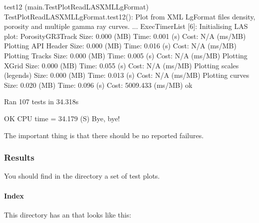 \documentclass[letterpaper,10pt,english]{sphinxmanual}
\begin{document}
\begin{sphinxVerbatim}[commandchars=\\\{\}]
test\PYGZus{}12 (\PYGZus{}\PYGZus{}main\PYGZus{}\PYGZus{}.TestPlotReadLAS\PYGZus{}XML\PYGZus{}LgFormat)
TestPlotReadLAS\PYGZus{}XML\PYGZus{}LgFormat.test\PYGZus{}12(): Plot from XML LgFormat files \PYGZhy{} density, porosity and multiple gamma ray curves. ...  ExecTimerList [6]:
 Initialising LAS plot: \PYGZdq{}Porosity\PYGZus{}GR\PYGZus{}3Track\PYGZdq{} Size:    0.000 (MB) Time:    0.001 (s) Cost:        N/A (ms/MB)
 Plotting API Header                         Size:    0.000 (MB) Time:    0.016 (s) Cost:        N/A (ms/MB)
 Plotting Tracks                             Size:    0.000 (MB) Time:    0.005 (s) Cost:        N/A (ms/MB)
 Plotting XGrid                              Size:    0.000 (MB) Time:    0.055 (s) Cost:        N/A (ms/MB)
 Plotting scales (legends)                   Size:    0.000 (MB) Time:    0.013 (s) Cost:        N/A (ms/MB)
 Plotting curves                             Size:    0.020 (MB) Time:    0.096 (s) Cost:   5009.433 (ms/MB)  ok

\PYGZhy{}\PYGZhy{}\PYGZhy{}\PYGZhy{}\PYGZhy{}\PYGZhy{}\PYGZhy{}\PYGZhy{}\PYGZhy{}\PYGZhy{}\PYGZhy{}\PYGZhy{}\PYGZhy{}\PYGZhy{}\PYGZhy{}\PYGZhy{}\PYGZhy{}\PYGZhy{}\PYGZhy{}\PYGZhy{}\PYGZhy{}\PYGZhy{}\PYGZhy{}\PYGZhy{}\PYGZhy{}\PYGZhy{}\PYGZhy{}\PYGZhy{}\PYGZhy{}\PYGZhy{}\PYGZhy{}\PYGZhy{}\PYGZhy{}\PYGZhy{}\PYGZhy{}\PYGZhy{}\PYGZhy{}\PYGZhy{}\PYGZhy{}\PYGZhy{}\PYGZhy{}\PYGZhy{}\PYGZhy{}\PYGZhy{}\PYGZhy{}\PYGZhy{}\PYGZhy{}\PYGZhy{}\PYGZhy{}\PYGZhy{}\PYGZhy{}\PYGZhy{}\PYGZhy{}\PYGZhy{}\PYGZhy{}\PYGZhy{}\PYGZhy{}\PYGZhy{}\PYGZhy{}\PYGZhy{}\PYGZhy{}\PYGZhy{}\PYGZhy{}\PYGZhy{}\PYGZhy{}\PYGZhy{}\PYGZhy{}\PYGZhy{}\PYGZhy{}\PYGZhy{}
Ran 107 tests in 34.318s

OK
CPU time =   34.179 (S)
Bye, bye!
\end{sphinxVerbatim}

The important thing is that there should be no reported failures.


\subsubsection{Results}
\label{\detokenize{testing/test_plot:results}}
You should find in the directory  a set of test plots.


\paragraph{Index}
\label{\detokenize{testing/test_plot:index}}
This directory has an  that looks like this:
\end{document}

